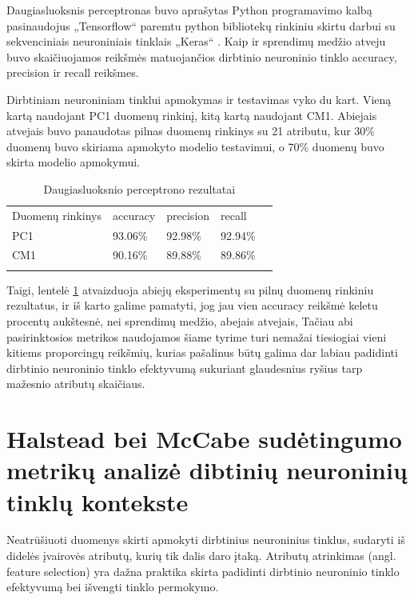 \documentclass{VUMIFPSbakalaurinis}
\begin{document}
Daugiasluoksnis perceptronas buvo aprašytas Python programavimo kalbą pasinaudojus „Tensorflow“ paremtu python bibliotekų rinkiniu skirtu darbui su sekvenciniais neuroniniais tinklais „Keras“ \cite{chollet2015keras}. Kaip ir sprendimų medžio atveju buvo skaičiuojamos reikšmės matuojančios dirbtinio neuroninio tinklo accuracy, precision ir recall reikšmes.

Dirbtiniam neuroniniam tinklui apmokymas ir testavimas vyko du kart. Vieną kartą naudojant PC1 duomenų rinkinį, kitą kartą naudojant CM1. Abiejais atvejais buvo panaudotas pilnas duomenų rinkinys su 21 atributu, kur 30\% duomenų buvo skiriama apmokyto modelio testavimui, o 70\% duomenų buvo skirta modelio apmokymui.

\begin{table}[H]\footnotesize
\centering
\caption{Daugiasluoksnio perceptrono rezultatai}
\label{tab:MLP_result}
\begin{tabular}{lllll}
\cline{1-4}
\multicolumn{1}{|l}{Duomenų rinkinys} & accuracy & precision & \multicolumn{1}{l|}{recall} &  \\ \cline{1-4}
\multicolumn{1}{|l}{PC1}              & 93.06\%   & 92.98\%     & \multicolumn{1}{l|}{92.94\%} &  \\
\multicolumn{1}{|l}{CM1}              & 90.16\%    & 89.88\%     & \multicolumn{1}{l|}{89.86\%}  &  \\ \cline{1-4}
                                      &          &           &                             & 
\end{tabular}
\end{table}

Taigi, lentelė \ref{tab:MLP_result} atvaizduoja abiejų eksperimentų su pilnų duomenų rinkiniu rezultatus, ir iš karto galime pamatyti, jog jau vien accuracy reikšmė keletu procentų aukštesnė, nei sprendimų medžio, abejais atvejais, Tačiau abi pasirinktosios metrikos naudojamos šiame tyrime turi nemažai tiesiogiai vieni kitiems proporcingų reikšmių, kurias pašalinus būtų galima dar labiau padidinti dirbtinio neuroninio tinklo efektyvumą sukuriant glaudesnius ryšius tarp mažesnio atributų skaičiaus.

\section{Halstead bei McCabe sudėtingumo metrikų analizė dibtinių neuroninių tinklų kontekste}

Neatrūšiuoti duomenys skirti apmokyti dirbtinius neuroninius tinklus, sudaryti iš didelės įvairovės atributų, kurių tik dalis daro įtaką. Atributų atrinkimas (angl. feature selection) yra dažna praktika skirta padidinti dirbtinio neuroninio tinklo efektyvumą bei išvengti tinklo permokymo.
\end{document}
